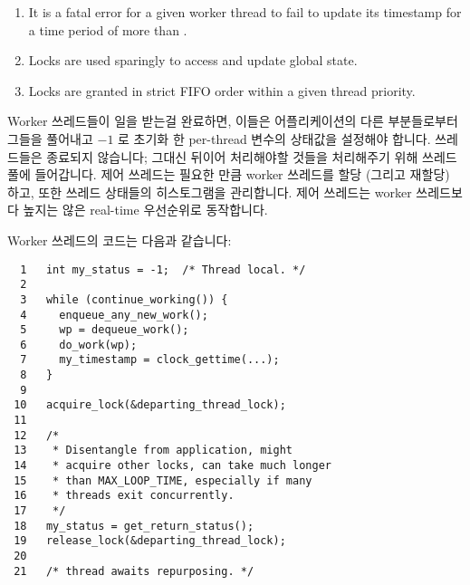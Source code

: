 {\begin{enumerate}
	\item	It is a fatal error for a given worker thread to fail
		to update its timestamp for a time period of more than
		.
	\item	Locks are used sparingly to access and update global
		state.
	\item	Locks are granted in strict FIFO order within
		a given thread priority.
	\fi
	\end{enumerate}

	Worker 쓰레드들이 일을 받는걸 완료하면, 이들은 어플리케이션의 다른
	부분들로부터 그들을 풀어내고 $-1$ 로 초기화 한 per-thread
	 변수의 상태값을 설정해야 합니다.
	쓰레드들은 종료되지 않습니다; 그대신 뒤이어 처리해야할 것들을
	처리해주기 위해 쓰레드 풀에 들어갑니다.
	제어 쓰레드는 필요한 만큼 worker 쓰레드를 할당 (그리고 재할당) 하고,
	또한 쓰레드 상태들의 히스토그램을 관리합니다.
	제어 쓰레드는 worker 쓰레드보다 높지는 않은 real-time 우선순위로
	동작합니다.

	Worker 쓰레드의 코드는 다음과 같습니다:
	\iffalse

	When worker threads complete their feed, they must disentangle
	themselves from the rest of the application and place a status
	value in a per-thread \co{my_status} variable that is initialized
	to $-1$.
	Threads do not exit; they instead are placed on a thread pool
	to accommodate later processing requirements.
	The control thread assigns (and re-assigns) worker threads as
	needed, and also maintains a histogram of thread statuses.
	The control thread runs at a real-time priority no higher than
	that of the worker threads.

	Worker threads' code is as follows:
	\fi

	\vspace{5pt}
	\begin{minipage}[t]{\columnwidth}
	\scriptsize
\begin{verbatim}
  1   int my_status = -1;  /* Thread local. */
  2 
  3   while (continue_working()) {
  4     enqueue_any_new_work();
  5     wp = dequeue_work();
  6     do_work(wp);
  7     my_timestamp = clock_gettime(...);
  8   }
  9 
 10   acquire_lock(&departing_thread_lock);
 11 
 12   /*
 13    * Disentangle from application, might
 14    * acquire other locks, can take much longer
 15    * than MAX_LOOP_TIME, especially if many
 16    * threads exit concurrently.
 17    */
 18   my_status = get_return_status();
 19   release_lock(&departing_thread_lock);
 20 
 21   /* thread awaits repurposing. */
\end{verbatim}
	\end{minipage}
	\vspace{5pt}

}
